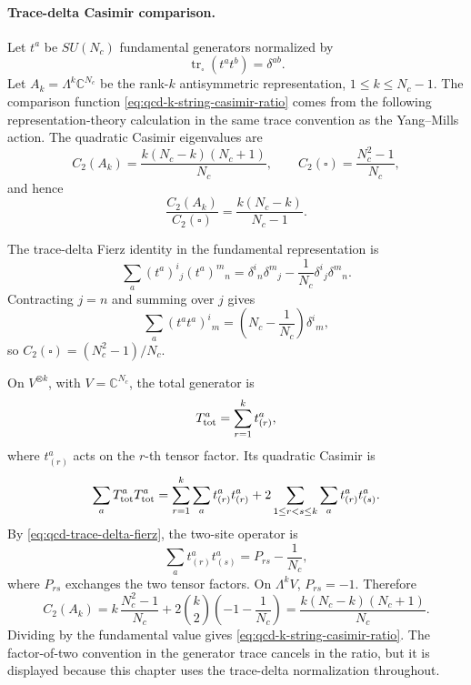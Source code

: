 \paragraph{Trace-delta Casimir comparison.}
Let \(t^a\) be \(SU(N_c)\) fundamental generators normalized by
\[
  \operatorname{tr}_{\square}(t^a t^b)=\delta^{ab}.
\]
Let \(A_k=\Lambda^k\mathbb C^{N_c}\) be the rank-\(k\) antisymmetric
representation, \(1\le k\le N_c-1\).  The comparison function
\eqref{eq:qcd-k-string-casimir-ratio} comes from the following
representation-theory calculation in the same trace convention as the
Yang--Mills action.  The quadratic Casimir eigenvalues are
\begin{equation}
  C_2(A_k)
  =
  \frac{k(N_c-k)(N_c+1)}{N_c},
  \qquad
  C_2(\square)
  =
  \frac{N_c^2-1}{N_c},
  \label{eq:qcd-k-string-casimirs}
\end{equation}
and hence
\[
  \frac{C_2(A_k)}{C_2(\square)}
  =
  \frac{k(N_c-k)}{N_c-1}.
\]

The trace-delta Fierz identity in the fundamental representation is
\begin{equation}
  \sum_a (t^a)^i{}_j(t^a)^m{}_n
  =
  \delta^i{}_n\delta^m{}_j
  -
  \frac1{N_c}\delta^i{}_j\delta^m{}_n .
  \label{eq:qcd-trace-delta-fierz}
\end{equation}
Contracting \(j=n\) and summing over \(j\) gives
\[
  \sum_a (t^a t^a)^i{}_m
  =
  \left(N_c-\frac1{N_c}\right)\delta^i{}_m,
\]
so \(C_2(\square)=(N_c^2-1)/N_c\).

On \(V^{\otimes k}\), with \(V=\mathbb C^{N_c}\), the total generator is
\[
  T^a_{\rm tot}=\sum_{r=1}^k t^a_{(r)} ,
\]
where \(t^a_{(r)}\) acts on the \(r\)-th tensor factor.  Its quadratic
Casimir is
\[
  \sum_a T^a_{\rm tot}T^a_{\rm tot}
  =
  \sum_{r=1}^k\sum_a t^a_{(r)}t^a_{(r)}
  +
  2\sum_{1\le r<s\le k}\sum_a t^a_{(r)}t^a_{(s)} .
\]
By \eqref{eq:qcd-trace-delta-fierz}, the two-site operator is
\[
  \sum_a t^a_{(r)}t^a_{(s)}
  =
  P_{rs}-\frac1{N_c},
\]
where \(P_{rs}\) exchanges the two tensor factors.  On
\(\Lambda^kV\), \(P_{rs}=-1\).  Therefore
\[
  C_2(A_k)
  =
  k\,\frac{N_c^2-1}{N_c}
  +
  2\binom{k}{2}\left(-1-\frac1{N_c}\right)
  =
  \frac{k(N_c-k)(N_c+1)}{N_c}.
\]
Dividing by the fundamental value gives
\eqref{eq:qcd-k-string-casimir-ratio}.  The factor-of-two convention in the
generator trace cancels in the ratio, but it is displayed because this
chapter uses the trace-delta normalization throughout.

